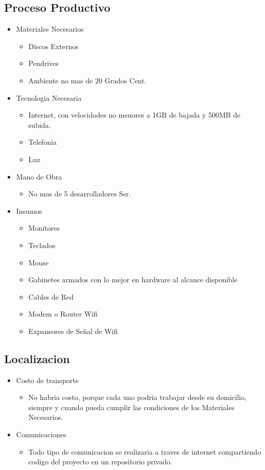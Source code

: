 \documentclass[
10pt, %
a4paper, %
oneside, %
headinclude,footinclude, %
BCOR5mm, %
]{scrartcl}
\begin{document}
\subsection{Proceso Productivo}
\begin{itemize}
  \item Materiales Necesarios
  \begin{itemize}
    \item Discos Externos
    \item Pendrives
    \item Ambiente no mas de 20 Grados Cent.
  \end{itemize}

  \item Tecnologia Necesaria
  \begin{itemize}
    \item Internet, con velocidades no menores a
            1GB de bajada y 500MB de subida.
    \item Telefonia
    \item Luz
  \end{itemize}

  \item Mano de Obra
  \begin{itemize}
    \item No mas de 5 desarrolladores Ssr.
  \end{itemize}

  \item Insumos
  \begin{itemize}
    \item Monitores
    \item Teclados
    \item Mouse
    \item Gabinetes armados con lo mejor en hardware al alcance disponible
    \item Cables de Red
    \item Modem o Router Wifi
    \item Expansores de Señal de Wifi
  \end{itemize}
\end{itemize}

\subsection{Localizacion}
\begin{itemize}
  \item Costo de transporte
  \begin{itemize}
    \item No habria costo, porque cada uno podria trabajar
            desde su domicilio, siempre y cuando pueda cumplir
            las condiciones de los Materiales Necesarios.
  \end{itemize}

  \item Comunicaciones
  \begin{itemize}
    \item Todo tipo de comunicacion se realizaria a traves de internet
            compartiendo codigo del proyecto en un repositorio privado.
  \end{itemize}
\end{itemize}
\end{document}
